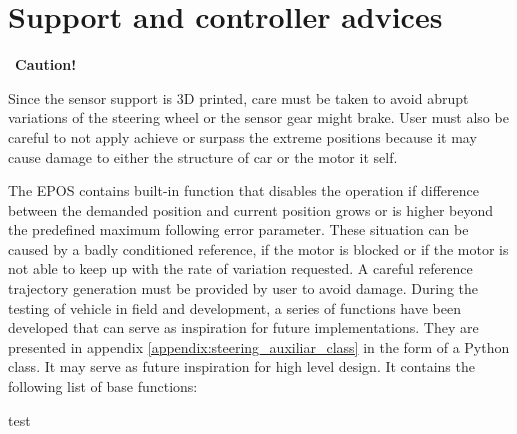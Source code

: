 \section{Support and controller advices}
\begin{mdframed}[backgroundcolor=red!20, roundcorner=10pt, innertopmargin=5pt, innerbottommargin=5pt, skipabove=0pt]
	 \Warning \, \textbf{Caution!}
\end{mdframed}
Since the sensor support is 3D printed, care must be taken to avoid abrupt variations of the steering wheel or the sensor gear might brake. User must also be careful to not apply achieve or surpass the extreme positions because it may cause damage to either the structure of car or the motor it self.

The \gls{EPOS} contains built-in function that disables the operation if difference between the demanded position and current position grows or is higher beyond the predefined maximum following error parameter. These situation can be caused by a badly conditioned reference, if the motor is blocked or if the motor is not able to keep up with the rate of variation requested. A careful reference trajectory generation must be provided by user to avoid damage. During the testing of vehicle in field and development, a series of functions have been developed that can serve as inspiration for future implementations. They are presented in appendix \ref{appendix:steering_auxiliar_class} in the form of a Python class. It may serve as future inspiration for high level design. It contains the following list of base functions:
\begin{description}[align=left, labelwidth=10em, leftmargin=5em, style=nextline]
    \item [getQcPosition] test
\end{description}

 